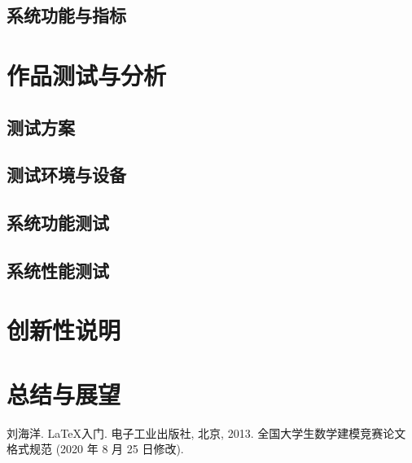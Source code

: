 \documentclass{cumcmthesis}
\begin{document}
\subsection{系统功能与指标}

\section{作品测试与分析}
\subsection{测试方案}
\subsection{测试环境与设备}
\subsection{系统功能测试}
\subsection{系统性能测试}
\section{创新性说明}
\section{总结与展望}


\begin{thebibliography}{9}%
    刘海洋.
    \newblock \LaTeX {}入门\allowbreak[J].
    \newblock 电子工业出版社, 北京, 2013.
    全国大学生数学建模竞赛论文格式规范 (2020 年 8 月 25 日修改).
\end{thebibliography}
\end{document}
